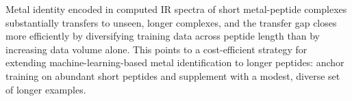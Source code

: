     {
    Metal identity encoded in computed IR spectra of short metal-peptide complexes substantially transfers to unseen, longer complexes, and the transfer gap closes more efficiently by diversifying training data across peptide length than by increasing data volume alone. This points to a cost-efficient strategy for extending machine-learning-based metal identification to longer peptides: anchor training on abundant short peptides and supplement with a modest, diverse set of longer examples.
    }

    \newpage
    